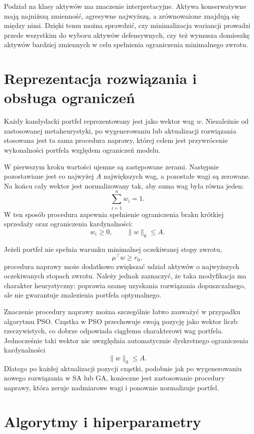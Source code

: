 \documentclass[12pt,a4paper]{article}
\begin{document}
Podział na klasy aktywów ma znaczenie interpretacyjne. Aktywa konserwatywne mają najniższą zmienność, agresywne najwyższą, a zrównoważone znajdują się między nimi. Dzięki temu można sprawdzić, czy minimalizacja wariancji prowadzi przede wszystkim do wyboru aktywów defensywnych, czy też wymusza domieszkę aktywów bardziej zmiennych w celu spełnienia ograniczenia minimalnego zwrotu.

\section{Reprezentacja rozwiązania i obsługa ograniczeń}

Każdy kandydacki portfel reprezentowany jest jako wektor wag $w$. Niezależnie od zastosowanej metaheurystyki, po wygenerowaniu lub aktualizacji rozwiązania stosowana jest ta sama procedura naprawy, której celem jest przywrócenie wykonalności portfela względem ograniczeń modelu.

W pierwszym kroku wartości ujemne są zastępowane zerami. Następnie pozostawiane jest co najwyżej $A$ największych wag, a pozostałe wagi są zerowane. Na końcu cały wektor jest normalizowany tak, aby suma wag była równa jeden:
\[
    \sum_{i=1}^{n} w_i = 1.
\]
W ten sposób procedura zapewnia spełnienie ograniczenia braku krótkiej sprzedaży oraz ograniczenia kardynalności:
\[
    w_i \geq 0,
    \qquad
    \|w\|_0 \leq A.
\]

Jeżeli portfel nie spełnia warunku minimalnej oczekiwanej stopy zwrotu,
\[
    \mu^\top w \geq r_0,
\]
procedura naprawy może dodatkowo zwiększać udział aktywów o najwyższych oczekiwanych stopach zwrotu. Należy jednak zaznaczyć, że taka modyfikacja ma charakter heurystyczny: poprawia szansę uzyskania rozwiązania dopuszczalnego, ale nie gwarantuje znalezienia portfela optymalnego.

Znaczenie procedury naprawy można szczególnie łatwo zauważyć w przypadku algorytmu PSO. Cząstka w PSO przechowuje swoją pozycję jako wektor liczb rzeczywistych, co dobrze odpowiada ciągłemu charakterowi wag portfela. Jednocześnie taki wektor nie uwzględnia automatycznie dyskretnego ograniczenia kardynalności
\[
    \|w\|_0 \leq A.
\]
Dlatego po każdej aktualizacji pozycji cząstki, podobnie jak po wygenerowaniu nowego rozwiązania w SA lub GA, konieczne jest zastosowanie procedury naprawy, która zeruje nadmiarowe wagi i ponownie normalizuje portfel.

\section{Algorytmy i hiperparametry}
\end{document}

